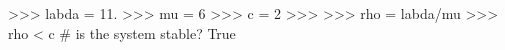 
>>> labda = 11.
>>> mu = 6
>>> c = 2
>>>
>>> rho = labda/mu
>>> rho < c  # is the system stable?
True


